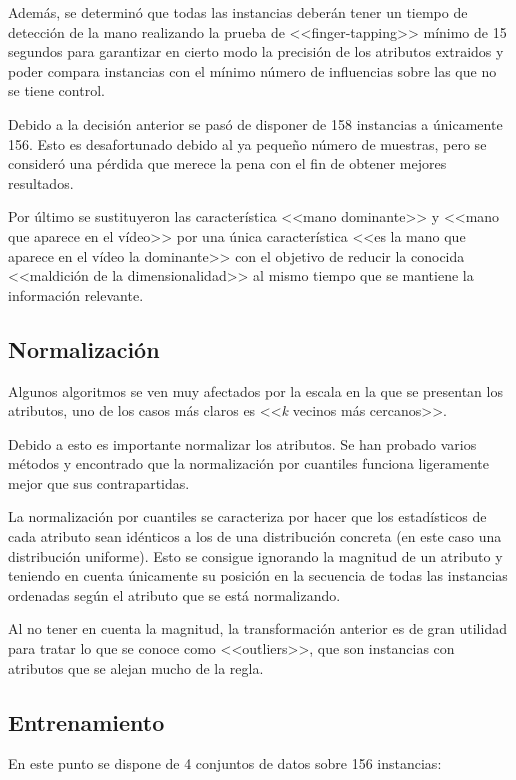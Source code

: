 Además, se determinó que todas las instancias deberán tener un tiempo de
detección de la mano realizando la prueba de <<finger-tapping>> mínimo de 15
segundos para garantizar en cierto modo la precisión de los atributos extraidos
y poder compara instancias con el mínimo número de influencias sobre las que no
se tiene control.

Debido a la decisión anterior se pasó de disponer de 158 instancias a únicamente
156. Esto es desafortunado debido al ya pequeño número de muestras, pero se
consideró una pérdida que merece la pena con el fin de obtener mejores
resultados.

Por último se sustituyeron las característica <<mano dominante>> y <<mano que
aparece en el vídeo>> por una única característica <<es la mano que aparece en
el vídeo la dominante>> con el objetivo de reducir la conocida <<maldición de la
dimensionalidad>> al mismo tiempo que se mantiene la información relevante.

\subsection{Normalización}

Algunos algoritmos se ven muy afectados por la escala en la que se presentan los
atributos, uno de los casos más claros es <<\textit{k} vecinos más cercanos>>.

Debido a esto es importante normalizar los atributos. Se han probado varios
métodos y encontrado que la normalización por cuantiles funciona ligeramente
mejor que sus contrapartidas.

La normalización por cuantiles se caracteriza por hacer que los estadísticos de
cada atributo sean idénticos a los de una distribución concreta (en este caso
una distribución uniforme). Esto se consigue ignorando la magnitud de un
atributo y teniendo en cuenta únicamente su posición en la secuencia de todas
las instancias ordenadas según el atributo que se está normalizando.

Al no tener en cuenta la magnitud, la transformación anterior es de gran
utilidad para tratar lo que se conoce como <<outliers>>, que son instancias con
atributos que se alejan mucho de la regla.

\subsection{Entrenamiento}

En este punto se dispone de 4 conjuntos de datos sobre 156 instancias:


